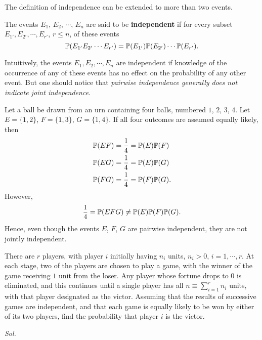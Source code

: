 The definition of independence can be extended to more than two events. 

\begin{definition}
    The events $E_1$, $E_2$, $\cdots$, $E_n$ are said to be \textbf{independent} if for every subset $E_{1'}, E_{2'}, \cdots, E_{r'}$, $r \le n$, of these events 
    \begin{equation*}
        \mathbb{P} (E_{1'}E_{2'} \cdots E_{r'}) = \mathbb{P}(E_{1'}) \mathbb{P}(E_{2'}) \cdots \mathbb{P}(E_{r'}).
    \end{equation*}
\end{definition}

\begin{remark}
    Intuitively, the events $E_1, E_2, \cdots , E_n$ are independent if knowledge of the occurrence of any of these events has no effect on the probability of any other event. But one should notice that \textit{\textcolor{RubineRed}{pairwise independence generally does not indicate joint independence}}.
\end{remark}

\begin{example} 
    Let a ball be drawn from an urn containing four balls, numbered $1$, $2$, $3$, $4$. Let $E = \{1, 2\}$, $F = \{1, 3\}$, $G = \{1, 4\}$. If all four outcomes are assumed equally likely, then
    \begin{align*}
        \mathbb{P} (EF) & = \frac{1}{4} = \mathbb{P} (E) \mathbb{P} (F) \\ 
        \mathbb{P} (EG) & = \frac{1}{4} = \mathbb{P} (E) \mathbb{P} (G) \\ 
        \mathbb{P} (FG) & = \frac{1}{4} = \mathbb{P} (F) \mathbb{P} (G).
    \end{align*}
    However, 
    \begin{equation*}
        \frac{1}{4} = \mathbb{P} (EFG) \neq \mathbb{P} (E) \mathbb{P} (F) \mathbb{P}(G).
    \end{equation*}
    Hence, even though the events $E$, $F$, $G$ are pairwise independent, they are not jointly independent.
\end{example}

\begin{example}
    There are $r$ players, with player $i$ initially having $n_i$ units, $n_i > 0$, $i = 1, \cdots , r$. At each stage, two of the players are chosen to play a game, with the winner of the game receiving $1$ unit from the loser. Any player whose fortune drops to $0$ is eliminated, and this continues until a single player has all $n \equiv \sum_{i=1}^r n_i$ units, with that player designated as the victor. Assuming that the results of successive games are independent, and that each game is equally likely to be won by either of its two players, find the probability that player $i$ is the victor.

    \textit{ Sol. }
\end{example}